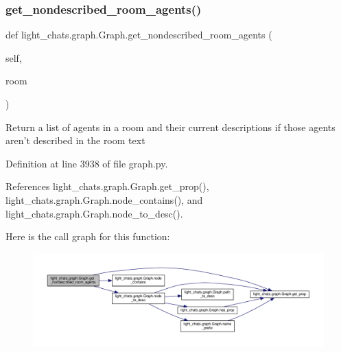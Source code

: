 \subsubsection{\texorpdfstring{get\+\_\+nondescribed\+\_\+room\+\_\+agents()}{get\_nondescribed\_room\_agents()}}
{\footnotesize\ttfamily def light\+\_\+chats.\+graph.\+Graph.\+get\+\_\+nondescribed\+\_\+room\+\_\+agents (\begin{DoxyParamCaption}\item[{}]{self,  }\item[{}]{room }\end{DoxyParamCaption})}

\begin{DoxyVerb}Return a list of agents in a room and their current descriptions
if those agents aren't described in the room text\end{DoxyVerb}
 

Definition at line 3938 of file graph.\+py.



References light\+\_\+chats.\+graph.\+Graph.\+get\+\_\+prop(), light\+\_\+chats.\+graph.\+Graph.\+node\+\_\+contains(), and light\+\_\+chats.\+graph.\+Graph.\+node\+\_\+to\+\_\+desc().

Here is the call graph for this function\+:
\nopagebreak
\begin{figure}[H]
\begin{center}
\leavevmode
\includegraphics[width=350pt]{classlight__chats_1_1graph_1_1Graph_ae8a732327aed100ff96fb2349246738c_cgraph}
\end{center}
\end{figure}
\mbox{\label{classlight__chats_1_1graph_1_1Graph_a3830f1a541b3a892a6e37c314b5b5205}} 
